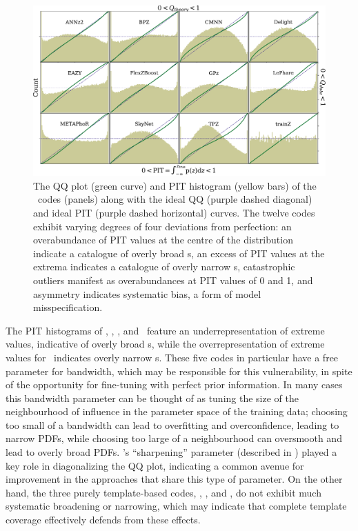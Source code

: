\begin{figure}
	\centering
	\includegraphics[width=\textwidth]{figures/pzdc1/PITQQcombo_12codes_AIM.pdf}
	\caption[The QQ plot and PIT histogram of twelve \pzpdf\ codes]
		{The QQ plot (green curve) and PIT histogram (yellow bars) of the \pzpdf\ codes (panels) along with the ideal QQ (purple dashed diagonal) and ideal PIT (purple dashed horizontal) curves.
		The twelve codes exhibit varying degrees of four deviations from perfection: an overabundance of PIT values at the centre of the distribution indicate a catalogue of overly broad \pzpdf s, an excess of PIT values at the extrema indicates a catalogue of overly narrow \pzpdf s, catastrophic outliers manifest as overabundances at PIT values of 0 and 1, and asymmetry indicates systematic bias, a form of model misspecification.}
\end{figure}

The PIT histograms of \delight, \cmnn, \skynet, and \tpz\ feature an underrepresentation of extreme values, indicative of overly broad \pzpdf s, while the overrepresentation of extreme values for \metaphor\ indicates overly narrow \pzpdf s.
These five codes in particular have a free parameter for bandwidth, which may be responsible for this vulnerability, in spite of the opportunity for fine-tuning with perfect prior information.  
In many cases this bandwidth parameter can be thought of as tuning the size of the neighbourhood of influence in the parameter space of the training data; 
choosing too small of a bandwidth can lead to overfitting and overconfidence, leading to narrow PDFs, while choosing too large of a neighbourhood can oversmooth and lead to overly broad PDFs.
\flexzboost's ``sharpening'' parameter (described in ) played a key role in diagonalizing the QQ plot, indicating a common avenue for improvement in the approaches that share this type of parameter.
On the other hand, the three purely template-based codes, \bpz, \eazy, and \lephare, do not exhibit much systematic broadening or narrowing, which may indicate that complete template coverage effectively defends from these effects.

